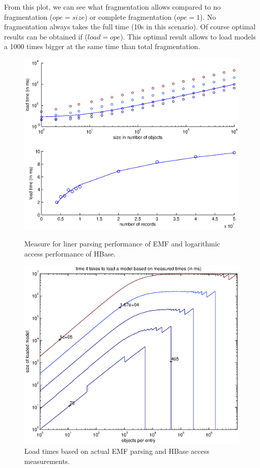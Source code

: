 From this plot, we can see what fragmentation allows compared to no fragmentation ($ope=size$) or complete fragmentation ($ope=1$). No fragmentation always takes the full time (10s in this scenario). Of course optimal results can be obtained if ($load=ope$). This optimal result allows to load models a 1000 times bigger at the same time than total fragmentation. 

\begin{figure}[ht]
\begin{minipage}[b]{0.5\linewidth}
\centering
\includegraphics[width=\linewidth]{figures/emf_hbase_performance_measured}
\caption{Measure for liner parsing performance of EMF and logarithmic access performance of HBase.}
\label{fig:figures/emf_hbase_performance_measured}
\end{minipage}
\hspace{0.5cm}
\begin{minipage}[b]{0.5\linewidth}
\centering
\includegraphics[width=\linewidth]{figures/optimal_load_times_measured}
\caption{Load times based on actual EMF parsing and HBase access measurements.}
\label{fig:optimal_load_times_measured}
\end{minipage}
\end{figure}

